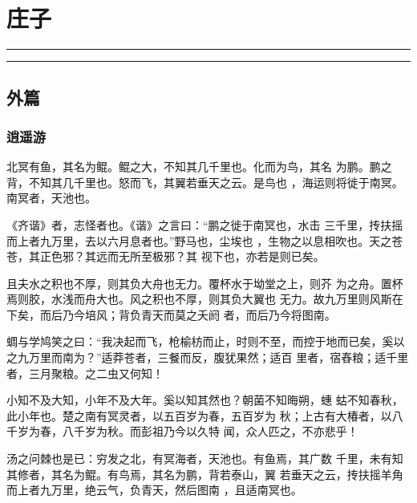 \documentclass[]{article}
\date{}
\begin{document}
\hypertarget{header-n1933}{%
\section{庄子}\label{header-n1933}}

\begin{center}\rule{0.5\linewidth}{\linethickness}\end{center}

\tableofcontents

\begin{center}\rule{0.5\linewidth}{\linethickness}\end{center}

\hypertarget{header-n1941}{%
\subsection{外篇}\label{header-n1941}}

\hypertarget{header-n1942}{%
\subsubsection{逍遥游}\label{header-n1942}}

北冥有鱼，其名为鲲。鲲之大，不知其几千里也。化而为鸟，其名
为鹏。鹏之背，不知其几千里也。怒而飞，其翼若垂天之云。是鸟也
，海运则将徙于南冥。南冥者，天池也。

《齐谐》者，志怪者也。《谐》之言曰：``鹏之徙于南冥也，水击
三千里，抟扶摇而上者九万里，去以六月息者也。''野马也，尘埃也
，生物之以息相吹也。天之苍苍，其正色邪？其远而无所至极邪？其
视下也，亦若是则已矣。

且夫水之积也不厚，则其负大舟也无力。覆杯水于坳堂之上，则芥
为之舟。置杯焉则胶，水浅而舟大也。风之积也不厚，则其负大翼也
无力。故九万里则风斯在下矣，而后乃今培风；背负青天而莫之夭阏
者，而后乃今将图南。

蜩与学鸠笑之曰：``我决起而飞，枪榆枋而止，时则不至，而控于地而已矣，奚以之九万里而南为？''适莽苍者，三餐而反，腹犹果然；适百
里者，宿舂粮；适千里者，三月聚粮。之二虫又何知！

小知不及大知，小年不及大年。奚以知其然也？朝菌不知晦朔，蟪
蛄不知春秋，此小年也。楚之南有冥灵者，以五百岁为春，五百岁为
秋；上古有大椿者，以八千岁为春，八千岁为秋。而彭祖乃今以久特
闻，众人匹之，不亦悲乎！

汤之问棘也是已：穷发之北，有冥海者，天池也。有鱼焉，其广数
千里，未有知其修者，其名为鲲。有鸟焉，其名为鹏，背若泰山，翼
若垂天之云，抟扶摇羊角而上者九万里，绝云气，负青天，然后图南
，且适南冥也。
\end{document}

